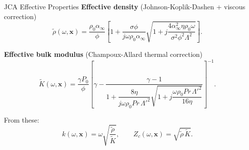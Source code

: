 \documentclass[aspectratio=169,11pt]{beamer}
\begin{document}
\begin{frame}{JCA Effective Properties}
  \footnotesize
  \textbf{Effective density} (Johnson-Koplik-Dashen + viscous correction)
  \begin{equation}
    \tilde{\rho}(\omega,\mathbf{x}) = \frac{\rho_0\alpha_\infty}{\phi}
    \left[
      1 + \frac{\sigma\phi}{j\omega\rho_0\alpha_\infty}
      \sqrt{1 + j\frac{4\alpha_\infty^2\eta\rho_0\omega}{\sigma^2\phi^2\Lambda^2}}
    \right].
  \end{equation}

  \vspace{0.1cm}
  \textbf{Effective bulk modulus} (Champoux-Allard thermal correction)
  \begin{equation}
    \tilde{K}(\omega,\mathbf{x}) = \frac{\gamma P_0}{\phi}
    \left[
      \gamma - \frac{\gamma-1}{1 + \dfrac{8\eta}{j\omega\rho_0 Pr\,\Lambda'^2}
      \sqrt{1 + j\dfrac{\omega\rho_0 Pr\,\Lambda'^2}{16\eta}}}
    \right]^{-1}.
  \end{equation}

  \vspace{0.1cm}
  From these:
  \[
    k(\omega,\mathbf{x}) = \omega\sqrt{\frac{\tilde{\rho}}{\tilde{K}}}, \qquad
    Z_c(\omega,\mathbf{x}) = \sqrt{\tilde{\rho}\,\tilde{K}}.
  \]
\end{frame}
\end{document}
